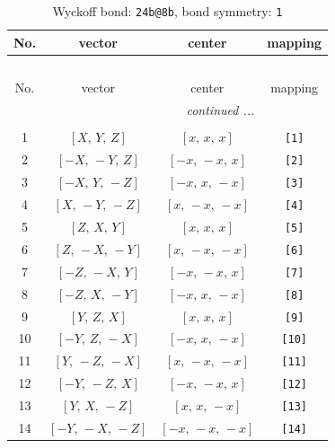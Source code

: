 \documentclass[fleqn,8pt]{jsarticle}
\begin{document}
\begin{longtable}{cccc}
\caption{Wyckoff bond: {\tt 24b@8b}, bond symmetry: {\tt 1}}
 \\
 \hline \hline
No. & vector & center & mapping \\ \hline \endfirsthead

\multicolumn{3}{l}{\tablename\ \thetable{}} \\
 \hline \hline
No. & vector & center & mapping \\ \hline \endhead

 \hline \hline
\multicolumn{3}{r}{\footnotesize\it continued ...} \\ \endfoot

 \hline \hline
\multicolumn{3}{r}{} \\ \endlastfoot

1 & $\left[ X,\, Y,\, Z \right]$ & $\left[ x,\, x,\, x \right]$ & {\tt [1]} \\ \hline
2 & $\left[ - X,\, - Y,\, Z \right]$ & $\left[ - x,\, - x,\, x \right]$ & {\tt [2]} \\ \hline
3 & $\left[ - X,\, Y,\, - Z \right]$ & $\left[ - x,\, x,\, - x \right]$ & {\tt [3]} \\ \hline
4 & $\left[ X,\, - Y,\, - Z \right]$ & $\left[ x,\, - x,\, - x \right]$ & {\tt [4]} \\ \hline
5 & $\left[ Z,\, X,\, Y \right]$ & $\left[ x,\, x,\, x \right]$ & {\tt [5]} \\ \hline
6 & $\left[ Z,\, - X,\, - Y \right]$ & $\left[ x,\, - x,\, - x \right]$ & {\tt [6]} \\ \hline
7 & $\left[ - Z,\, - X,\, Y \right]$ & $\left[ - x,\, - x,\, x \right]$ & {\tt [7]} \\ \hline
8 & $\left[ - Z,\, X,\, - Y \right]$ & $\left[ - x,\, x,\, - x \right]$ & {\tt [8]} \\ \hline
9 & $\left[ Y,\, Z,\, X \right]$ & $\left[ x,\, x,\, x \right]$ & {\tt [9]} \\ \hline
10 & $\left[ - Y,\, Z,\, - X \right]$ & $\left[ - x,\, x,\, - x \right]$ & {\tt [10]} \\ \hline
11 & $\left[ Y,\, - Z,\, - X \right]$ & $\left[ x,\, - x,\, - x \right]$ & {\tt [11]} \\ \hline
12 & $\left[ - Y,\, - Z,\, X \right]$ & $\left[ - x,\, - x,\, x \right]$ & {\tt [12]} \\ \hline
13 & $\left[ Y,\, X,\, - Z \right]$ & $\left[ x,\, x,\, - x \right]$ & {\tt [13]} \\ \hline
14 & $\left[ - Y,\, - X,\, - Z \right]$ & $\left[ - x,\, - x,\, - x \right]$ & {\tt [14]} \\ \hline

\end{longtable}
\end{document}
